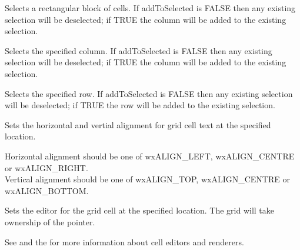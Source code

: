 {

Selects a rectangular block of cells. If addToSelected is FALSE then any existing selection will be
deselected; if TRUE the column will be added to the existing selection. 

\label{wxgridselectcol}


Selects the specified column. If addToSelected is FALSE then any existing selection will be
deselected; if TRUE the column will be added to the existing selection.

\label{wxgridselectrow}


Selects the specified row. If addToSelected is FALSE then any existing selection will be
deselected; if TRUE the row will be added to the existing selection.

\label{wxgridsetcellalignment}


Sets the horizontal and vertial alignment for grid cell text at the specified location.

Horizontal alignment should be one of wxALIGN_LEFT, wxALIGN_CENTRE or wxALIGN_RIGHT. \\
Vertical alignment should be one of wxALIGN_TOP, wxALIGN_CENTRE or wxALIGN_BOTTOM.

\label{wxgridsetcelleditor}


Sets the editor for the grid cell at the specified location. 
The grid will take ownership of the pointer.

See  and
the  for more information about cell editors and renderers.

\label{wxgridsetcellfont}


}

